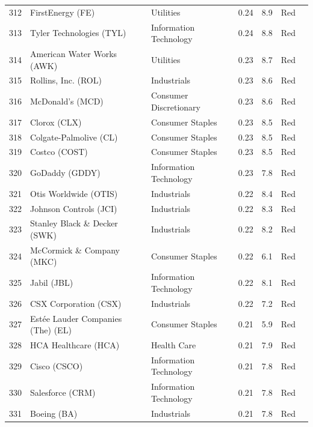\documentclass[11pt,a4paper]{article}
\begin{document}
{\begin{longtable}{r p{4.4cm} p{2.8cm} r r l l}
312 & FirstEnergy (FE) & Utilities & 0.24 & 8.9 & \cellcolor[HTML]{F4B6B6}Red &  \\
313 & Tyler Technologies (TYL) & Information Technology & 0.24 & 8.8 & \cellcolor[HTML]{F4B6B6}Red &  \\
314 & American Water Works (AWK) & Utilities & 0.23 & 8.7 & \cellcolor[HTML]{F4B6B6}Red &  \\
315 & Rollins, Inc. (ROL) & Industrials & 0.23 & 8.6 & \cellcolor[HTML]{F4B6B6}Red &  \\
316 & McDonald's (MCD) & Consumer Discretionary & 0.23 & 8.6 & \cellcolor[HTML]{F4B6B6}Red &  \\
317 & Clorox (CLX) & Consumer Staples & 0.23 & 8.5 & \cellcolor[HTML]{F4B6B6}Red &  \\
318 & Colgate-Palmolive (CL) & Consumer Staples & 0.23 & 8.5 & \cellcolor[HTML]{F4B6B6}Red &  \\
319 & Costco (COST) & Consumer Staples & 0.23 & 8.5 & \cellcolor[HTML]{F4B6B6}Red &  \\
320 & GoDaddy (GDDY) & Information Technology & 0.23 & 7.8 & \cellcolor[HTML]{F4B6B6}Red &  \\
321 & Otis Worldwide (OTIS) & Industrials & 0.22 & 8.4 & \cellcolor[HTML]{F4B6B6}Red &  \\
322 & Johnson Controls (JCI) & Industrials & 0.22 & 8.3 & \cellcolor[HTML]{F4B6B6}Red &  \\
323 & Stanley Black \& Decker (SWK) & Industrials & 0.22 & 8.2 & \cellcolor[HTML]{F4B6B6}Red &  \\
324 & McCormick \& Company (MKC) & Consumer Staples & 0.22 & 6.1 & \cellcolor[HTML]{F4B6B6}Red &  \\
325 & Jabil (JBL) & Information Technology & 0.22 & 8.1 & \cellcolor[HTML]{F4B6B6}Red &  \\
326 & CSX Corporation (CSX) & Industrials & 0.22 & 7.2 & \cellcolor[HTML]{F4B6B6}Red &  \\
327 & Estée Lauder Companies (The) (EL) & Consumer Staples & 0.21 & 5.9 & \cellcolor[HTML]{F4B6B6}Red &  \\
328 & HCA Healthcare (HCA) & Health Care & 0.21 & 7.9 & \cellcolor[HTML]{F4B6B6}Red &  \\
329 & Cisco (CSCO) & Information Technology & 0.21 & 7.8 & \cellcolor[HTML]{F4B6B6}Red &  \\
330 & Salesforce (CRM) & Information Technology & 0.21 & 7.8 & \cellcolor[HTML]{F4B6B6}Red &  \\
331 & Boeing (BA) & Industrials & 0.21 & 7.8 & \cellcolor[HTML]{F4B6B6}Red &  \\

\end{longtable}}
\end{document}
